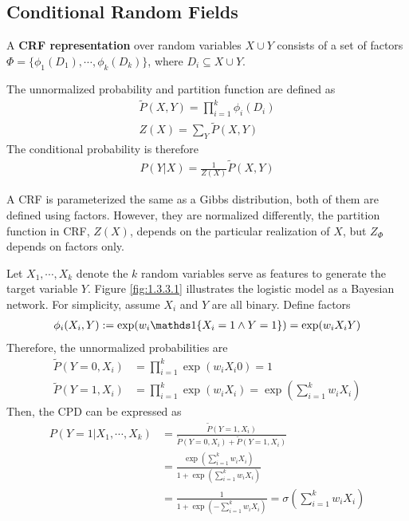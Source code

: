\documentclass[11pt]{article}
\begin{document}
	\subsection{Conditional Random Fields}
	\begin{definition}[CRF]
		A \textbf{CRF representation} over random variables $X \cup Y$ consists of a set of factors $\Phi = \{\phi_1(D_1), \cdots, \phi_k(D_k)\}$, where $D_i \subseteq X \cup Y$.
		
		The unnormalized probability and partition function are defined as
		\begin{align}
			\tilde{P}(X, Y) = \prod_{i=1}^k \phi_i(D_i) \\
			Z(X) = \sum_Y \tilde{P}(X, Y)
		\end{align}
		The conditional probability is therefore
		\begin{align}
			P(Y|X) = \frac{1}{Z(X)} \tilde{P}(X, Y)
		\end{align}
	\end{definition}
	
	\begin{remark}
		A CRF is parameterized the same as a Gibbs distribution, both of them are defined using factors. However, they are normalized differently, the partition function in CRF, $Z(X)$, depends on the particular realization of $X$, but $Z_\Phi$ depends on factors only.
	\end{remark}
	
	\begin{example}
		Let $X_1, \cdots, X_k$ denote the $k$ random variables serve as features to generate the target variable $Y$. Figure \ref{fig:1.3.3.1} illustrates the logistic model as a Bayesian network. For simplicity, assume $X_i$ and $Y$ are all binary. Define factors
		\begin{align}
			\phi_i(X_i, Y) := \exp(w_i \id{X_i=1 \land Y=1}) = \exp(w_i X_i Y)
		\end{align}
		Therefore, the unnormalized probabilities are
		\begin{align}
			\tilde{P}(Y=0, X_i) &= \prod_{i=1}^k \exp(w_i X_i 0) = 1 \\
			\tilde{P}(Y=1, X_i) &= \prod_{i=1}^k \exp(w_i X_i) = \exp \left(\sum_{i=1}^k w_i X_i\right)
		\end{align}
		Then, the CPD can be expressed as
		\begin{align}
			P(Y=1|X_1, \cdots, X_k) &= \frac{\tilde{P}(Y=1, X_i)}{\tilde{P}(Y=0, X_i) + \tilde{P}(Y=1, X_i)} \\
			&= \frac{\exp \left(\sum_{i=1}^k w_i X_i\right)}{1 + \exp \left(\sum_{i=1}^k w_i X_i\right)} \\
			&= \frac{1}{1 + \exp \left(-\sum_{i=1}^k w_i X_i\right)} = \sigma \left(\sum_{i=1}^k w_i X_i\right)
		\end{align}
	\end{example}
\end{document}
